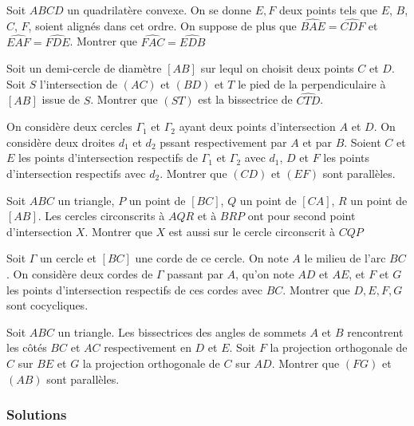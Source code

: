 \begin{exo}
Soit $ABCD$ un quadrilatère convexe. On se donne $E, F$ deux points tels que $E$, $B$, $C$, $F$, soient alignés dans cet ordre. On suppose de plus que $\widehat{BAE} = \widehat{CDF}$ et $\widehat{EAF} = \widehat{FDE}$. Montrer que $\widehat{FAC}=\widehat{EDB}$
\end{exo}


\begin{exo}
Soit un demi-cercle de diamètre $[AB]$ sur lequl on choisit deux points $C$ et $D$. Soit $S$ l'intersection de $(AC)$ et $(BD)$ et $T$ le pied de la perpendiculaire à $[AB]$ issue de $S$. Montrer que $(ST)$ est la bissectrice de $\widehat{CTD}$.
\end{exo}


\begin{exo}
On considère deux cercles $\Gamma_1$ et $\Gamma_2$ ayant deux points d'intersection $A$ et $D$. On considère deux droites $d_1$ et $d_2$ pssant respectivement par $A$ et par $B$. Soient $C$ et $E$ les points d'intersection respectifs de $\Gamma_1$ et $\Gamma_2$ avec $d_1$, $D$ et $F$ les points d'intersection respectifs avec $d_2$. Montrer que $(CD)$ et $(EF)$ sont parallèles.
\end{exo}


\begin{exo}
Soit $ABC$ un triangle, $P$ un point de $[BC]$, $Q$ un point de $[CA]$, $R$ un point de $[AB]$. Les cercles circonscrits à $AQR$ et à $BRP$ ont pour second point d'intersection $X$.
Montrer que $X$ est aussi sur le cercle circonscrit à $CQP$
\end{exo}

\begin{exo}
Soit $\Gamma$ un cercle et $[BC]$ une corde de ce cercle. On note $A$ le milieu de l'arc $BC$. On considère deux cordes de $\Gamma$ passant par $A$, qu'on note $AD$ et $AE$, et $F$ et $G$ les points d'intersection respectifs de ces cordes avec $BC$. Montrer que $D, E, F, G$ sont cocycliques.
\end{exo}

\begin{exo}
Soit $ABC$ un triangle. Les bissectrices des angles de sommets $A$ et $B$ rencontrent les côtés $BC$ et $AC$ respectivement en $D$ et $E$. Soit $F$ la projection orthogonale de $C$ sur $BE$ et $G$ la projection orthogonale de $C$ sur $AD$. Montrer que $(FG)$ et $(AB)$ sont parallèles.
\end{exo}

\subsubsection{Solutions}


